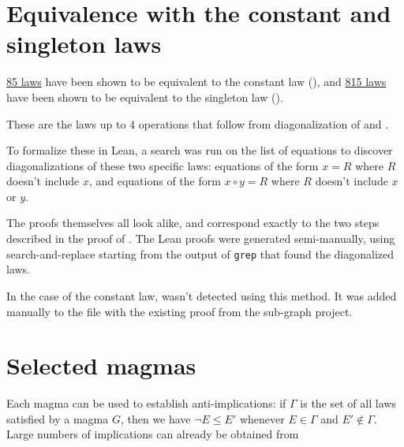 \chapter{Equivalence with the constant and singleton laws}\label{constant-chapter}

\href{https://github.com/teorth/equational_theories/blob/main/equational_theories/Generated/Constant.lean}{85 laws}
have been shown to be equivalent to the constant law (), and
\href{https://github.com/teorth/equational_theories/blob/main/equational_theories/Generated/Singleton.lean}{815 laws}
have been shown to be equivalent to the singleton law ().

These are the laws up to 4 operations that follow from diagonalization of  and .

To formalize these in Lean, a search was run on the list of equations to discover
diagonalizations of these two specific laws: equations of the form $x = R$ where $R$ doesn't include
$x$, and equations of the form $x \circ y = R$ where $R$ doesn't include $x$ or $y$.

The proofs themselves all look alike, and correspond exactly to the two steps described in the proof
of . The Lean proofs were generated semi-manually, using search-and-replace starting from
the output of \texttt{grep} that found the diagonalized laws.

In the case of the constant law,  wasn't detected using
this method. It was added manually to the file with the existing proof from the sub-graph project.


\chapter{Selected magmas}\label{selected-magmas-chapter}

Each magma can be used to establish anti-implications: if $\Gamma$ is the set of all laws satisfied by a magma $G$, then we have $\neg E \leq E'$ whenever $E \in \Gamma$ and $E' \not \in \Gamma$.  Large numbers of implications can already be obtained from

